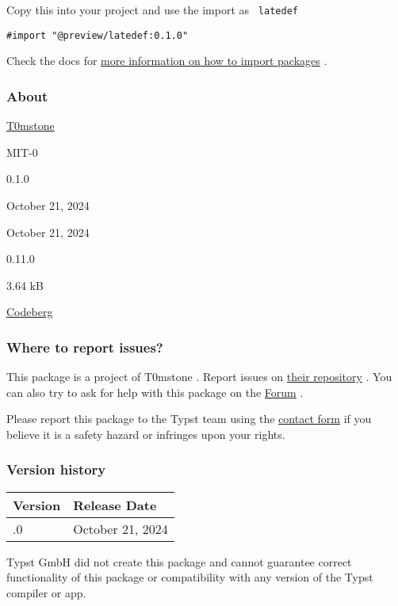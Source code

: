Copy this into your project and use the import as \texttt{\ latedef\ }

\begin{verbatim}
#import "@preview/latedef:0.1.0"
\end{verbatim}



Check the docs for
\href{https://typst.app/docs/reference/scripting/\#packages}{more
information on how to import packages} .

\subsubsection{About}\label{about}

\begin{description}
\tightlist
\item[Author :]
\href{mailto:realt0mstone@gmail.com}{T0mstone}
\item[License:]
MIT-0
\item[Current version:]
0.1.0
\item[Last updated:]
October 21, 2024
\item[First released:]
October 21, 2024
\item[Minimum Typst version:]
0.11.0
\item[Archive size:]
3.64 kB
\href{https://packages.typst.org/preview/latedef-0.1.0.tar.gz}{\pandocbounded{}}
\item[Repository:]
\href{https://codeberg.org/T0mstone/typst-latedef}{Codeberg}
\end{description}

\subsubsection{Where to report issues?}\label{where-to-report-issues}

This package is a project of T0mstone . Report issues on
\href{https://codeberg.org/T0mstone/typst-latedef}{their repository} .
You can also try to ask for help with this package on the
\href{https://forum.typst.app}{Forum} .

Please report this package to the Typst team using the
\href{https://typst.app/contact}{contact form} if you believe it is a
safety hazard or infringes upon your rights.

\label{versions}
\subsubsection{Version history}\label{version-history}

\begin{longtable}[]{@{}ll@{}}
\toprule\noalign{}
Version & Release Date \\
\midrule\noalign{}
\endhead
\bottomrule\noalign{}
\endlastfoot
0.1.0 & October 21, 2024 \\
\end{longtable}

Typst GmbH did not create this package and cannot guarantee correct
functionality of this package or compatibility with any version of the
Typst compiler or app.
